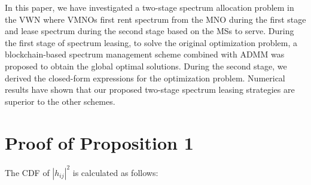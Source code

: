\documentclass[journal]{IEEEtran}
\begin{document}
\begin{IEEEkeywords}
In this paper, we have investigated a two-stage spectrum allocation problem in the VWN where VMNOs first rent spectrum from the MNO during the first stage and lease spectrum during the second stage based on the MSs to serve. During the first stage of spectrum leasing, to solve the original optimization problem, a blockchain-based spectrum management scheme combined with ADMM was proposed to obtain the global optimal solutions. During the second stage, we derived the closed-form expressions for the optimization problem. Numerical results have shown that our proposed two-stage spectrum leasing strategies are superior to the other schemes.
\appendices
\section{Proof of Proposition 1}
The CDF of $\left|h_{ij} \right|^2$ is calculated as follows:


\end{IEEEkeywords}
\end{document}
